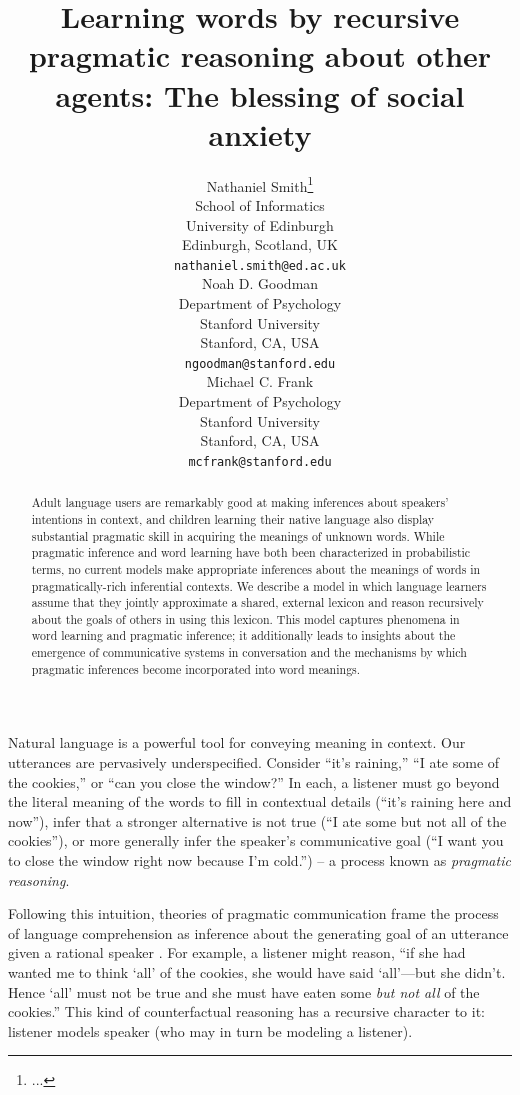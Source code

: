 \documentclass{article} %
\title{Learning words by recursive pragmatic reasoning about other agents: The blessing of social anxiety}
\author{
Nathaniel Smith\thanks{...} \\
School of Informatics\\
University of Edinburgh\\
Edinburgh, Scotland, UK\\
\texttt{nathaniel.smith@ed.ac.uk} \\
\AND
Noah D. Goodman \\
Department of Psychology\\
Stanford University \\
Stanford, CA, USA \\
\texttt{ngoodman@stanford.edu} \\
\And
Michael C. Frank \\
Department of Psychology \\
Stanford University \\
Stanford, CA, USA \\
\texttt{mcfrank@stanford.edu}}
\begin{document}
\maketitle

\begin{abstract}
  Adult language users are remarkably good at making inferences about speakers' intentions in context, and children learning their native language also display substantial pragmatic skill in acquiring the meanings of unknown words. While pragmatic inference and word learning have both been characterized in probabilistic terms, no current models make appropriate inferences about the meanings of words in pragmatically-rich inferential contexts. We describe a model in which language learners assume that they jointly approximate a shared, external lexicon and reason recursively about the goals of others in using this lexicon. This model captures phenomena in word learning and pragmatic inference; it additionally leads to insights about the emergence of communicative systems in conversation and the mechanisms by which pragmatic inferences become incorporated into word meanings.
\end{abstract}


Natural language is a powerful tool for conveying meaning in context. Our utterances are pervasively underspecified. Consider ``it's raining,'' ``I ate some of the cookies,'' or ``can you close the window?'' In each, a listener must go beyond the literal meaning of the words to fill in contextual details (``it's raining here and now''), infer that a stronger alternative is not true (``I ate some but not all of the cookies''), or more generally infer the speaker's communicative goal (``I want you to close the window right now because I'm cold.'') -- a process known as \textit{pragmatic reasoning}.

Following this intuition, theories of pragmatic communication frame the process of language comprehension as inference about the generating goal of an utterance given a rational speaker \cite{grice1975,dale1995,frank2012}. For example, a listener might reason, ``if she had wanted me to think `all' of the cookies, she would have said `all'---but she didn't. Hence `all' must not be true and she must have eaten some {\it but not all} of the cookies.'' This kind of counterfactual reasoning has a recursive character to it: listener models speaker (who may in turn be modeling a listener).
\end{document}
